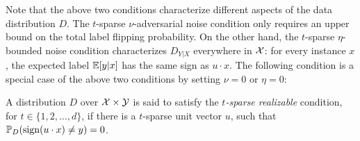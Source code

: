 Note that the above two conditions characterize different aspects of the data distribution $D$. The $t$-sparse $\nu$-adversarial noise condition only requires an upper bound on the total label flipping probability. On the other hand, the $t$-sparse $\eta$-bounded noise condition characterizes $D_{Y|X}$ everywhere in $\mathcal{X}$: for every instance $x$, the expected label $\mathbb{E}[y|x]$ has the same sign as $u \cdot x$.
The following condition is a special case of the above two conditions by setting $\nu = 0$ or $\eta = 0$:

\begin{definition}
A distribution $D$ over $\mathcal{X} \times \mathcal{Y}$ is said to satisfy the {\em $t$-sparse realizable} condition, for $t \in \{1,2,\ldots,d\}$, if there is a $t$-sparse unit vector $u$, such that $\mathbb{P}_D(\operatorname{sign}(u \cdot x) \neq y) = 0$.
\label{def:r}
\end{definition}





